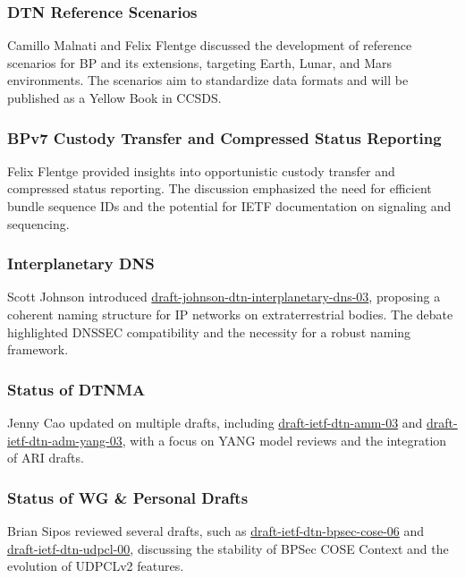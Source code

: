 \documentclass{article}
\begin{document}
\subsubsection{DTN Reference Scenarios}
Camillo Malnati and Felix Flentge discussed the development of reference scenarios for BP and its extensions, targeting Earth, Lunar, and Mars environments. The scenarios aim to standardize data formats and will be published as a Yellow Book in CCSDS.

\subsubsection{BPv7 Custody Transfer and Compressed Status Reporting}
Felix Flentge provided insights into opportunistic custody transfer and compressed status reporting. The discussion emphasized the need for efficient bundle sequence IDs and the potential for IETF documentation on signaling and sequencing.

\subsubsection{Interplanetary DNS}
Scott Johnson introduced \href{https://datatracker.ietf.org/doc/html/draft-johnson-dtn-interplanetary-dns-03}{draft-johnson-dtn-interplanetary-dns-03}, proposing a coherent naming structure for IP networks on extraterrestrial bodies. The debate highlighted DNSSEC compatibility and the necessity for a robust naming framework.

\subsubsection{Status of DTNMA}
Jenny Cao updated on multiple drafts, including \href{https://datatracker.ietf.org/doc/html/draft-ietf-dtn-amm-03}{draft-ietf-dtn-amm-03} and \href{https://datatracker.ietf.org/doc/html/draft-ietf-dtn-adm-yang-03}{draft-ietf-dtn-adm-yang-03}, with a focus on YANG model reviews and the integration of ARI drafts.

\subsubsection{Status of WG \& Personal Drafts}
Brian Sipos reviewed several drafts, such as \href{https://datatracker.ietf.org/doc/html/draft-ietf-dtn-bpsec-cose-06}{draft-ietf-dtn-bpsec-cose-06} and \href{https://datatracker.ietf.org/doc/html/draft-ietf-dtn-udpcl-00}{draft-ietf-dtn-udpcl-00}, discussing the stability of BPSec COSE Context and the evolution of UDPCLv2 features.
\end{document}
